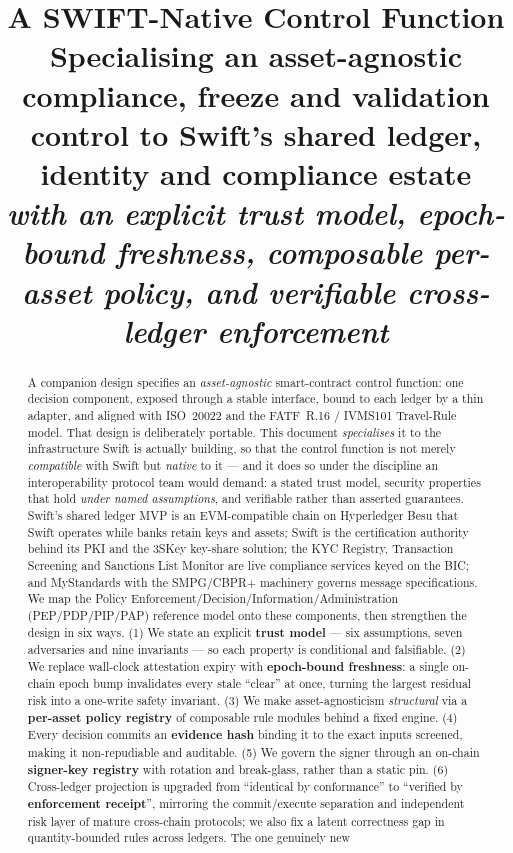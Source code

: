 \documentclass[11pt,a4paper]{article}
\title{\vspace{-1.0cm}\textbf{A SWIFT-Native Control Function}\\[2pt]
\large Specialising an asset-agnostic compliance, freeze and validation control
to Swift's shared ledger, identity and compliance estate\\[2pt]
\normalsize\itshape with an explicit trust model, epoch-bound freshness,
composable per-asset policy, and verifiable cross-ledger enforcement}
\begin{document}
\maketitle

\begin{abstract}
\noindent
A companion design specifies an \emph{asset-agnostic} smart-contract control
function: one decision component, exposed through a stable interface, bound to
each ledger by a thin adapter, and aligned with ISO~20022 and the FATF~R.16 /
IVMS101 Travel-Rule model. That design is deliberately portable. This document
\emph{specialises} it to the infrastructure Swift is actually building, so that
the control function is not merely \emph{compatible} with Swift but \emph{native}
to it --- and it does so under the discipline an interoperability protocol team
would demand: a stated trust model, security properties that hold \emph{under
named assumptions}, and verifiable rather than asserted guarantees. Swift's
shared ledger MVP is an EVM-compatible chain on Hyperledger Besu that Swift
operates while banks retain keys and assets; Swift is the certification authority
behind its PKI and the 3SKey key-share solution; the KYC Registry, Transaction
Screening and Sanctions List Monitor are live compliance services keyed on the
BIC; and MyStandards with the SMPG/CBPR+ machinery governs message
specifications. We map the Policy
Enforcement/Decision/Information/Administration (PEP/PDP/PIP/PAP) reference model
onto these components, then strengthen the design in six ways. (1) We state an
explicit \textbf{trust model} --- six assumptions, seven adversaries and nine
invariants --- so each property is conditional and falsifiable. (2) We replace wall-clock
attestation expiry with \textbf{epoch-bound freshness}: a single on-chain epoch
bump invalidates every stale ``clear'' at once, turning the largest residual risk
into a one-write safety invariant. (3) We make asset-agnosticism
\emph{structural} via a \textbf{per-asset policy registry} of composable rule
modules behind a fixed engine. (4) Every decision commits an \textbf{evidence
hash} binding it to the exact inputs screened, making it non-repudiable and
auditable. (5) We govern the signer through an on-chain \textbf{signer-key
registry} with rotation and break-glass, rather than a static pin. (6) Cross-ledger
projection is upgraded from ``identical by conformance'' to ``verified by
\textbf{enforcement receipt}'', mirroring the commit/execute separation and
independent risk layer of mature cross-chain protocols; we also fix a latent
correctness gap in quantity-bounded rules across ledgers. The one genuinely new

\end{abstract}
\end{document}
